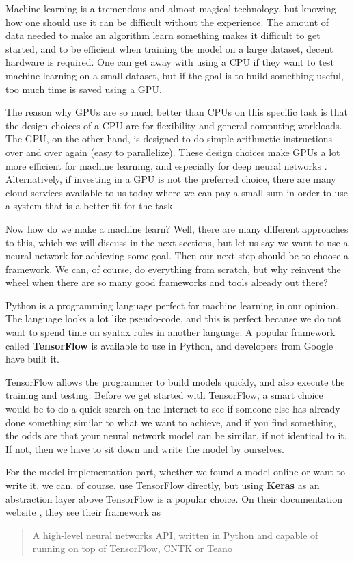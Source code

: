 Machine learning is a tremendous and almost magical technology, but knowing how one should use it can be difficult without the experience. 
The amount of data needed to make an algorithm learn something makes it difficult to get started, and to be efficient when training the model on a large dataset, 
decent hardware is required. One can get away with using a CPU if they want to test machine learning on a small dataset, but if the goal is to build something useful, 
too much time is saved using a GPU. 

The reason why GPUs are so much better than CPUs on this specific task is that the design choices of a CPU are for flexibility and general computing workloads. 
The GPU, on the other hand, is designed to do simple arithmetic instructions over and over again (easy to parallelize). These design choices make GPUs a lot more 
efficient for machine learning, and especially for deep neural networks \cite{cpu_vs_gpu_ml}. Alternatively, if investing in a GPU is not the preferred choice, 
there are many cloud services available to us today where we can pay a small sum in order to use a system that is a better fit for the task.

Now how do we make a machine learn? Well, there are many different approaches to this, which we will discuss in the next sections, but let us say we want to 
use a neural network for achieving some goal. Then our next step should be to choose a framework. We can, of course, do everything from scratch, but why 
reinvent the wheel when there are so many good frameworks and tools already out there? 

Python is a programming language perfect for machine learning in our opinion. The language looks a lot like pseudo-code, and this is perfect because we do not 
want to spend time on syntax rules in another language. A popular framework called \textbf{TensorFlow} is available to use in Python, and developers from Google have built it. 

TensorFlow allows the programmer to build models quickly, and also execute the training and testing. Before we get started with TensorFlow, a smart choice 
would be to do a quick search on the Internet to see if someone else has already done something similar to what we want to achieve, and if you find something, 
the odds are that your neural network model can be similar, if not identical to it. If not, then we have to sit down and write the model by ourselves. 

For the model implementation part, whether we found a model online or want to write it, we can, of course, use TensorFlow directly, but using \textbf{Keras} 
as an abstraction layer above TensorFlow is a popular choice. On their documentation website \cite{keras_docs}, they see their framework as 
\blockquote{A high-level neural networks API, written in Python and capable of running on top of TensorFlow, CNTK or Teano}.

